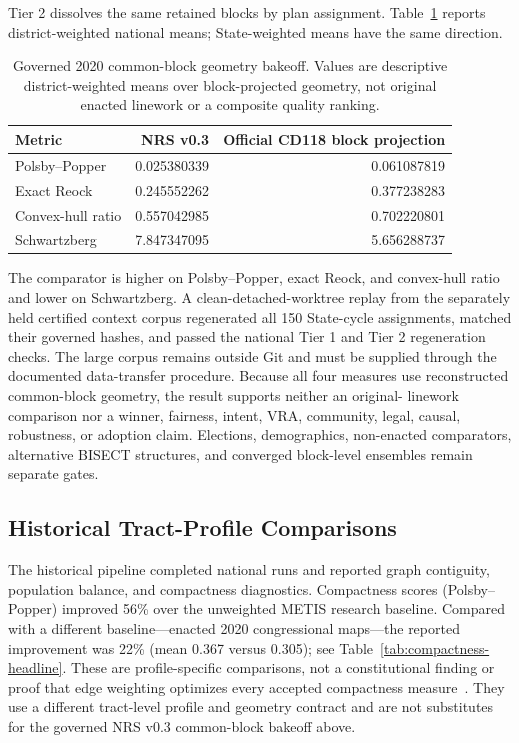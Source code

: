 Tier 2 dissolves the same retained blocks by plan assignment. Table~\ref{tab:nrs-national-geometry}
reports district-weighted national means; State-weighted means have the same
direction.

\begin{table}[h]
\centering
\begin{tabular}{lrr}
\toprule
Metric & NRS v0.3 & Official CD118 block projection \\
\midrule
Polsby--Popper & 0.025380339 & 0.061087819 \\
Exact Reock & 0.245552262 & 0.377238283 \\
Convex-hull ratio & 0.557042985 & 0.702220801 \\
Schwartzberg & 7.847347095 & 5.656288737 \\
\bottomrule
\end{tabular}
\caption{Governed 2020 common-block geometry bakeoff. Values are descriptive
district-weighted means over block-projected geometry, not original enacted
linework or a composite quality ranking.}
\label{tab:nrs-national-geometry}
\end{table}

The comparator is higher on Polsby--Popper, exact Reock, and convex-hull ratio
and lower on Schwartzberg. A clean-detached-worktree replay from the separately
held certified context corpus regenerated all 150 State-cycle assignments,
matched their governed hashes, and passed the national Tier 1 and Tier 2
regeneration checks. The large corpus remains outside Git and must be supplied
through the documented data-transfer procedure. Because all four measures use
reconstructed common-block geometry, the result supports neither an original-
linework comparison nor a winner, fairness, intent, VRA, community, legal,
causal, robustness, or adoption claim. Elections, demographics, non-enacted
comparators, alternative BISECT structures, and converged block-level ensembles
remain separate gates.

\subsection{Historical Tract-Profile Comparisons}

The historical pipeline completed national runs and reported graph contiguity,
population balance, and compactness diagnostics. Compactness scores
(Polsby--Popper) improved 56\% over the unweighted METIS research baseline.
Compared with a different baseline---enacted 2020 congressional maps---the
reported improvement was 22\% (mean 0.367 versus 0.305); see
Table~\ref{tab:compactness-headline}. These are profile-specific comparisons,
not a constitutional finding or proof that edge weighting optimizes every
accepted compactness measure~\cite{deluca2026edgeweighted}. They use a
different tract-level profile and geometry contract and are not substitutes
for the governed NRS v0.3 common-block bakeoff above.

